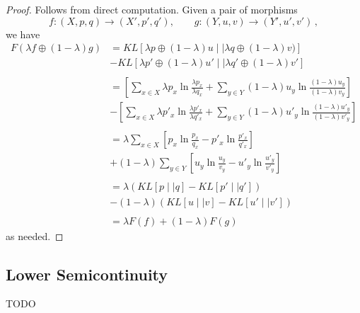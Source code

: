 \documentclass{article}
\begin{document}
\begin{proof}
Follows from direct computation.
Given a pair of morphisms
$$
f:(X, p, q) \rightarrow (X', p', q'), \qquad g:(Y, u, v) \rightarrow (Y', u', v')\,,
$$
we have
\begin{align*}
  F(\lambda f \oplus (1-\lambda) g)
  &= KL[\lambda p \oplus (1-\lambda)u \mid\mid \lambda q \oplus (1-\lambda)v)] \\
  & - KL[ \lambda p' \oplus (1-\lambda)u' \mid\mid \lambda q' \oplus (1-\lambda)v'] \\
  \\
  &= \left[\sum_{x\in X} \lambda p_x \ln \frac{\lambda p_x}{\lambda q_x}  + \sum_{y\in Y} (1-\lambda) u_y \ln \frac{(1-\lambda) u_y}{(1-\lambda) v_y}\right]\\
  & - \left[\sum_{x\in X}\lambda p'_x \ln \frac{\lambda p'_x}{\lambda q'_x} +  \sum_{y\in Y}(1-\lambda)u'_y \ln \frac{(1-\lambda) u'_y}{(1-\lambda) v'_y}\right]\\
  \\
  &= \lambda \sum_{x\in X} \left[p_x \ln \frac{p_x}{q_x} -  p'_x \ln \frac{p'_x}{q'_x} \right]\\
  &+ (1-\lambda) \sum_{y\in Y} \left[u_y \ln \frac{u_y}{v_y} - u'_y \ln \frac{u'_y}{v'_y} \right]\\
  \\
  &= \lambda \left(KL[p \mid\mid q] - KL[p' \mid\mid q']\right)\\
  & - (1-\lambda) \left(KL[u \mid\mid v] - KL[u' \mid\mid v']\right) \\
  \\
  &= \lambda F(f) + (1-\lambda) F(g)
\end{align*}
as needed.
\end{proof}

\subsection{Lower Semicontinuity}
TODO
\end{document}
